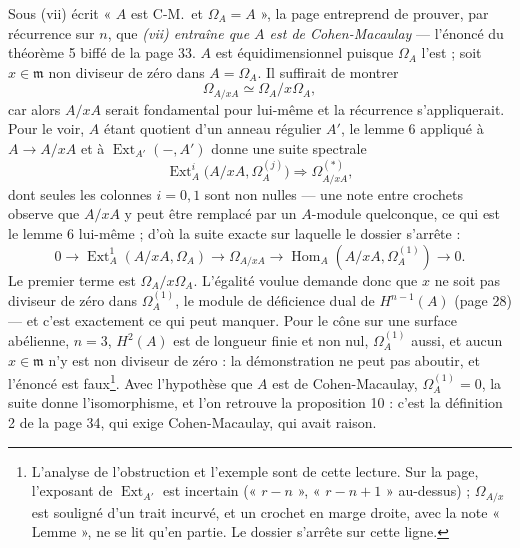 \documentclass[11pt,a4paper]{article}
\begin{document}
Sous (vii) écrit « $A$ est C-M.\ et $\Omega_A = A$ », la page entreprend de
prouver, par récurrence sur $n$, que \emph{(vii) entraîne que $A$ est de
Cohen-Macaulay} --- l'énoncé du théorème 5 biffé de la page 33. $A$ est
équidimensionnel puisque $\Omega_A$ l'est ; soit $x \in \mathfrak{m}$ non
diviseur de zéro dans $A = \Omega_A$. Il suffirait de montrer
\[
  \Omega_{A/xA} \simeq \Omega_A/x\Omega_A ,
\]
car alors $A/xA$ serait fondamental pour lui-même et la récurrence
s'appliquerait. Pour le voir, $A$ étant quotient d'un anneau régulier $A'$, le
lemme 6 appliqué à $A \to A/xA$ et à $\operatorname{Ext}_{A'}(-, A')$ donne une
suite spectrale
\[
  \operatorname{Ext}^i_A\bigl(A/xA, \Omega_A^{(j)}\bigr) \Rightarrow
  \Omega^{(\ast)}_{A/xA},
\]
dont seules les colonnes $i = 0, 1$ sont non nulles --- une note entre
crochets observe que $A/xA$ y peut être remplacé par un $A$-module
quelconque, ce qui est le lemme 6 lui-même ; d'où la suite exacte
sur laquelle le dossier s'arrête :
\[
  0 \to \operatorname{Ext}^1_A(A/xA, \Omega_A) \to \Omega_{A/xA} \to
  \operatorname{Hom}_A(A/xA, \Omega_A^{(1)}) \to 0 .
\]
Le premier terme est $\Omega_A/x\Omega_A$. L'égalité voulue demande donc que
$x$ ne soit pas diviseur de zéro dans $\Omega_A^{(1)}$, le module de déficience
dual de $H^{n-1}(A)$ (page 28) --- et c'est exactement ce qui peut manquer.
Pour le cône sur une surface abélienne, $n = 3$, $H^2(A)$ est de longueur
finie et non nul, $\Omega_A^{(1)}$ aussi, et aucun $x \in \mathfrak{m}$ n'y est
non diviseur de zéro : la démonstration ne peut pas aboutir, et l'énoncé est
faux\footnote{L'analyse de l'obstruction et l'exemple sont de cette lecture.
Sur la page, l'exposant de $\operatorname{Ext}_{A'}$ est incertain (« $r - n$ »,
« $r - n + 1$ » au-dessus) ; $\Omega_{A/x}$ est souligné d'un trait incurvé, et
un crochet en marge droite, avec la note « Lemme », ne se lit qu'en partie. Le
dossier s'arrête sur cette ligne.}. Avec l'hypothèse que $A$ est de
Cohen-Macaulay, $\Omega_A^{(1)} = 0$, la suite donne l'isomorphisme, et l'on
retrouve la proposition 10 : c'est la définition 2 de la page 34, qui exige
Cohen-Macaulay, qui avait raison.
\end{document}
